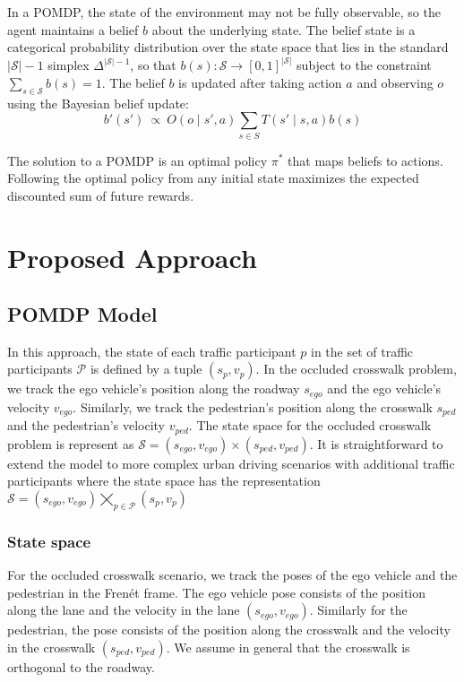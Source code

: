 \documentclass[conference]{IEEEtran}
\begin{document}
In a POMDP, the state of the environment may not be fully observable, so the agent maintains a belief $b$ about the underlying state. The belief state is a categorical probability distribution over the state space that lies in the standard $|\mathcal{S}|-1$ simplex $\Delta^{|\mathcal{S}|-1}$, so that $b(s): \mathcal{S} \rightarrow [0,1]^{|\mathcal{S}|}$ subject to the constraint $\sum_{s\in \mathcal{S}} b(s) = 1$. The belief $b$ is updated after taking action $a$ and observing $o$ using the Bayesian belief update:
\begin{equation}
    b'(s')~\propto~O(o \mid s', a) \sum_{s \in S} T(s' \mid s, a) b(s)
\end{equation}

The solution to a POMDP is an optimal policy $\pi^*$ that maps beliefs to actions. Following the optimal policy from any initial state maximizes the expected discounted sum of future rewards. %

\section{Proposed Approach}
\label{sec:proposed-approach}

\subsection{POMDP Model}

In this approach, the state of each traffic participant $p$ in the set of traffic participants $\mathcal{P}$ is defined by a tuple $(s_p, v_p)$. In the occluded crosswalk problem, we track the ego vehicle's position along the roadway $s_{ego}$ and the ego vehicle's velocity $v_{ego}$. Similarly, we track the pedestrian's position along the crosswalk $s_{ped}$ and the pedestrian's velocity $v_{ped}$. The state space for the occluded crosswalk problem is represent as $\mathcal{S} = (s_{ego}, v_{ego}) \times (s_{ped}, v_{ped})$. It is straightforward to extend the model to more complex urban driving scenarios with additional traffic participants where the state space has the representation $\mathcal{S} = (s_{ego}, v_{ego}) \bigtimes_{p\in\mathcal{P}}(s_p, v_p)$

\subsubsection{State space} For the occluded crosswalk scenario, we track the poses of the ego vehicle and the pedestrian in the Fren\'et frame. The ego vehicle pose consists of the position along the lane and the velocity in the lane $(s_{ego}, v_{ego})$. Similarly for the pedestrian, the pose consists of the position along the crosswalk and the velocity in the crosswalk $(s_{ped}, v_{ped})$. We assume in general that the crosswalk is orthogonal to the roadway.
\end{document}
